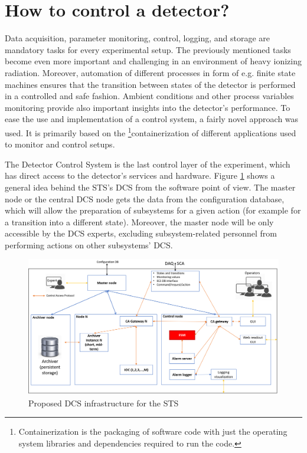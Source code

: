 \section{How to control a detector?}
Data acquisition, parameter monitoring, control, logging, and storage are mandatory tasks for every experimental setup. The previously mentioned tasks become even more important and challenging in an environment of heavy ionizing radiation. Moreover, automation of different processes in form of e.g. finite state machines ensures that the transition between states of the detector is performed in a controlled and safe fashion. Ambient conditions and other process variables monitoring provide also important insights into the detector's performance.  To ease the use and implementation of a control system, a fairly novel approach was used. It is primarily based on the \footnote{Containerization is the packaging of software code with just the operating system libraries and dependencies required to run the code.}{containerization} of different applications used to monitor and control setups. 

The Detector Control System is the last control layer of the experiment, which has direct access to the detector's services and hardware. Figure \ref{fig_arch} shows a general idea behind the \gls{STS}'s \gls{DCS} from the software point of view.  The master node or the central \gls{DCS} node gets the data from the configuration database, which will allow the preparation of subsystems for a given action (for example for a transition into a different state). Moreover, the master node will be only accessible by the \gls{DCS} experts, excluding subsystem-related personnel from performing actions on other subsystems' \gls{DCS}. 

\begin{figure}[!h]
\centering
\includegraphics[width=0.85\columnwidth]{Chapter3/Controls/images/DCS.png}
\caption{Proposed \gls{DCS} infrastructure for the \gls{STS}}
\label{fig_arch}
\end{figure}
\newpage





